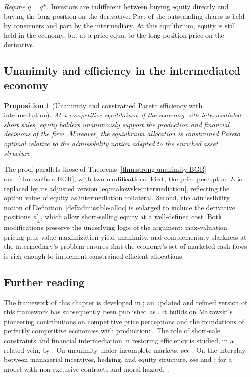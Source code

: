\documentclass[11pt,a4paper,oneside]{book}
\theoremstyle{plain}
\newtheorem{proposition}[theorem]{Proposition}
\theoremstyle{definition}
\theoremstyle{remark}
\numberwithin{equation}{chapter}
\begin{document}
\emph{Regime $q = q^+$.}
Investors are indifferent between buying equity directly and buying the long position on the derivative.
Part of the outstanding shares is held by consumers and part by the intermediary.
At this equilibrium, equity is still held in the economy, but at a price equal to the long-position price on the derivative.

\subsection{Unanimity and efficiency in the intermediated economy}

\begin{proposition}[Unanimity and constrained Pareto efficiency with intermediation]\label{prop:intermediated-unanimity}
At a competitive equilibrium of the economy with intermediated short sales, \emph{equity holders} unanimously support the production and financial decisions of the firm.
Moreover, the equilibrium allocation is constrained Pareto optimal relative to the admissibility notion adapted to the enriched asset structure.
\end{proposition}

The proof parallels those of Theorems~\ref{thm:strong-unanimity-BGR} and~\ref{thm:welfare-BGR}, with two modifications.
First, the price perception $\widetilde{E}$ is replaced by its adjusted version \eqref{eq:makowski-intermediation}, reflecting the option value of equity as intermediation collateral.
Second, the admissibility notion of Definition~\ref{def:admissible-alloc} is enlarged to include the derivative positions $\phi^i_\pm$, which allow short-selling equity at a well-defined cost.
Both modifications preserve the underlying logic of the argument: max-valuation pricing plus value maximization yield unanimity, and complementary slackness at the intermediary's problem ensures that the economy's set of marketed cash flows is rich enough to implement constrained-efficient allocations.

\subsection{Further reading}

The framework of this chapter is developed in \citet{BisinGottardiRuta2015}; an updated and refined version of this framework has subsequently been published as \citet{BisinClementiGottardi2025}.
It builds on Makowski's pioneering contributions on competitive price perceptions and the foundations of perfectly competitive economies with production: \citet{Makowski1980, Makowski1983a, Makowski1983b}.
The role of short-sale constraints and financial intermediation in restoring efficiency is studied, in a related vein, by \citet{AllenGale1991}.
On unanimity under incomplete markets, see \citet{CarcelesCoenPirani2009}.
On the interplay between managerial incentives, hedging, and equity structure, see \citet{AcharyaBisin2009} and \citet{BisinGottardiRampini2008}; for a model with non-exclusive contracts and moral hazard, \citet{BisinGuaitoli2004}.
\end{document}
